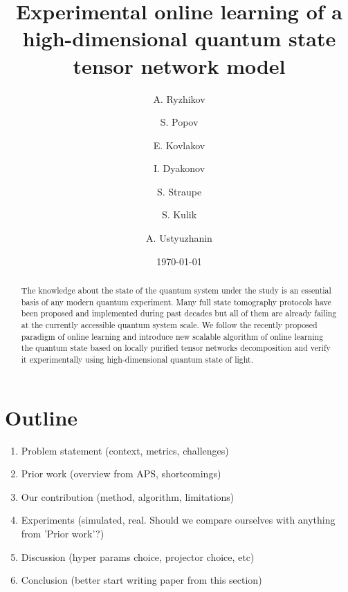\documentclass[%
 reprint,
 amsmath,amssymb,
 aps,
]{revtex4-2}
\begin{document}

\title{Experimental online learning of a high-dimensional quantum state tensor network model}%

\author{A. Ryzhikov}
\author{S. Popov}%
%

\author{E. Kovlakov}
\author{I. Dyakonov}
\author{S. Straupe}
\author{S. Kulik}
%

\author{A. Ustyuzhanin}
%

\date{\today}%

\begin{abstract}
The knowledge about the state of the quantum system under the study is an essential basis of any modern quantum experiment. Many full state tomography protocols have been proposed and implemented during past decades but all of them are already failing at the currently accessible quantum system scale. We follow the recently proposed paradigm of online learning and introduce new scalable algorithm of online learning the quantum state based on locally purified tensor networks decomposition and verify it experimentally using high-dimensional quantum state of light.
\end{abstract}

\maketitle

\section{Outline}
\begin{enumerate}
    \item Problem statement (context, metrics, challenges)
    \item Prior work (overview from APS, shortcomings)
    \item Our contribution (method, algorithm, limitations)
    \item Experiments (simulated, real. Should we compare ourselves with anything from 'Prior work'?)
    \item Discussion (hyper params choice, projector choice, etc)
    \item Conclusion (better start writing paper from this section)
\end{enumerate}
\end{document}
